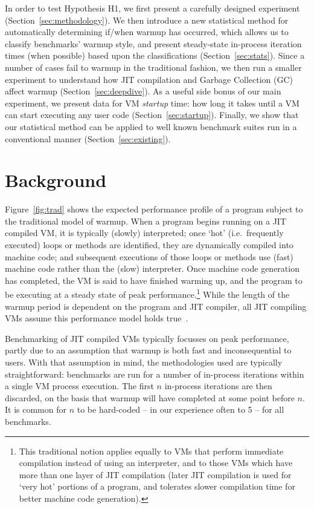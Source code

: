 \documentclass[preprint,numbers,10pt]{sigplanconf}
\begin{document}
\vspace{10pt}

\noindent In order to test Hypothesis H1, we first present a carefully designed
experiment (Section~\ref{sec:methodology}). We then introduce a new
statistical method for automatically determining if/when warmup has occurred,
which allows us to classify benchmarks' warmup style, and present steady-state
in-process iteration times (when possible) based upon the classifications
(Section~\ref{sec:stats}). Since a number of cases fail to warmup in the
traditional fashion, we then run a smaller experiment to understand how JIT
compilation and Garbage Collection (GC) affect warmup
(Section~\ref{sec:deepdive}). As a useful side bonus of our main experiment,
we present data for VM \emph{startup} time: how long it takes until a VM can
start executing any user code (Section~\ref{sec:startup}). Finally, we show that
our statistical method can be applied to well known benchmark suites run in a
conventional manner (Section~\ref{sec:existing}).


\section{Background}
\label{sec:warmup}

Figure~\ref{fig:trad} shows the expected performance profile of a
program subject to the traditional model of warmup.
When a program begins running on a JIT compiled VM, it is typically (slowly)
interpreted; once `hot' (i.e.~frequently executed) loops or methods are
identified, they are dynamically compiled into machine code; and subsequent
executions of those loops or methods use (fast) machine code rather than the
(slow) interpreter. Once machine code generation has completed, the VM is
said to have finished warming up, and the program to be executing
at a steady state of peak performance.\footnote{This traditional notion applies equally to VMs
that perform immediate compilation instead of using an interpreter, and to
those VMs which have more than one layer of JIT compilation (later JIT
compilation is used for `very hot' portions of a program, and tolerates slower
compilation time for better machine code generation).}
While the length of the warmup period
is dependent on the program and JIT compiler, all JIT compiling
VMs assume this performance model holds true~\cite{kalibera13rigorous}.

Benchmarking of JIT compiled VMs typically focusses on peak
performance, partly due to an assumption that
warmup is both fast and inconsequential to users. With that assumption in mind, the
methodologies used are typically straightforward: benchmarks are run for a number
of in-process iterations within a single VM process execution.
The first $n$ in-process iterations are then discarded, on the basis that warmup
will have completed at some point before $n$. It is common for
$n$ to be hard-coded -- in our experience often to 5 -- for all benchmarks.
\end{document}
